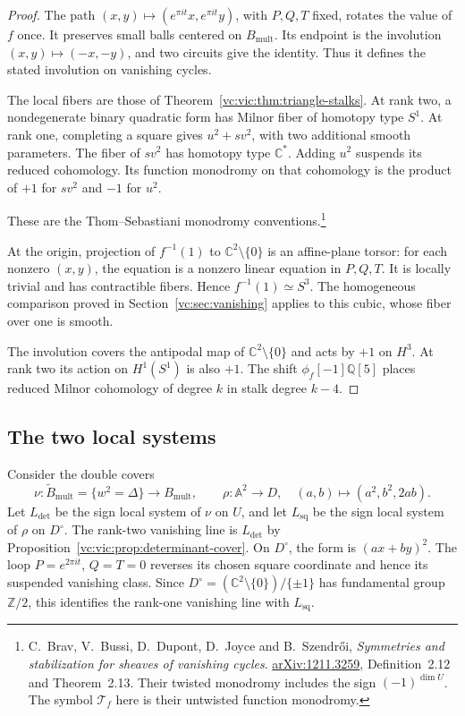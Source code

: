 \begin{proof}
The path $(x,y)\mapsto(e^{\pi it}x,e^{\pi it}y)$, with
$P,Q,T$ fixed, rotates the value of $f$ once. It preserves
small balls centered on $B_{\mathrm{mult}}$. Its endpoint is the involution
$(x,y)\mapsto(-x,-y)$, and two circuits give the identity.
Thus it defines the stated involution on vanishing cycles.

The local fibers are those of
Theorem~\ref{vc:vic:thm:triangle-stalks}. At rank two, a
nondegenerate binary quadratic form has Milnor fiber of
homotopy type $S^1$. At rank one, completing a square gives
$u^2+sv^2$, with two additional smooth parameters.
The fiber of $sv^2$ has homotopy type $\mathbb C^*$.
Adding $u^2$ suspends its reduced cohomology. Its function
monodromy on that cohomology is the product of $+1$ for
$sv^2$ and $-1$ for $u^2$.

These are the Thom--Sebastiani monodromy conventions.\footnote{
C.~Brav, V.~Bussi, D.~Dupont, D.~Joyce and B.~Szendr\H{o}i,
\emph{Symmetries and stabilization for sheaves of vanishing
cycles}. \href{https://arxiv.org/abs/1211.3259}{arXiv:1211.3259},
Definition~2.12 and Theorem~2.13. Their twisted monodromy
includes the sign $(-1)^{\dim U}$. The symbol $\mathcal T_f$ here is
their untwisted function monodromy.}

At the origin, projection of $f^{-1}(1)$ to
$\mathbb C^2\setminus\{0\}$ is an affine-plane torsor:
for each nonzero $(x,y)$, the equation is a nonzero linear
equation in $P,Q,T$. It is locally trivial and has
contractible fibers. Hence $f^{-1}(1)\simeq S^3$.
The homogeneous comparison proved in
Section~\ref{vc:sec:vanishing} applies to this cubic, whose
fiber over one is smooth.

The involution covers the antipodal map of
$\mathbb C^2\setminus\{0\}$ and acts by $+1$ on $H^3$.
At rank two its action on $H^1(S^1)$ is also $+1$.
The shift $\phi_f[-1]\mathbb Q[5]$ places reduced Milnor
cohomology of degree $k$ in stalk degree $k-4$.
\end{proof}

\subsection{The two local systems}

Consider the double covers
\begin{equation}\label{vc:cqm:eq:covers}
 \nu:\widetilde B_{\mathrm{mult}}=\{w^2=\Delta\}\longrightarrow B_{\mathrm{mult}},
 \qquad
 \rho:\mathbb A^2\longrightarrow D,
 \quad(a,b)\longmapsto(a^2,b^2,2ab).
\end{equation}
Let $L_{\det}$ be the sign local system of $\nu$ on $U$,
and let $L_{\mathrm{sq}}$ be the sign local system of
$\rho$ on $D^\circ$. 
The rank-two vanishing line is $L_{\det}$ by
Proposition~\ref{vc:vic:prop:determinant-cover}.
On $D^\circ$, the form
is $(ax+by)^2$. The loop $P=e^{2\pi it}$, $Q=T=0$ reverses
its chosen square coordinate and hence its suspended
vanishing class. Since
$D^\circ=(\mathbb C^2\setminus\{0\})/\{\pm1\}$ has
fundamental group $\mathbb Z/2$, this identifies the
rank-one vanishing line with $L_{\mathrm{sq}}$.

